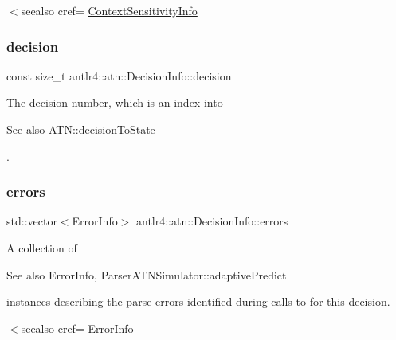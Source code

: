 $<$seealso cref= \hyperlink{classantlr4_1_1atn_1_1ContextSensitivityInfo}{Context\+Sensitivity\+Info} \mbox{\label{classantlr4_1_1atn_1_1DecisionInfo_ad81f14a210fb5e80f86ac800d56cc7bb}} 
\subsubsection{\texorpdfstring{decision}{decision}}
{\footnotesize\ttfamily const size\+\_\+t antlr4\+::atn\+::\+Decision\+Info\+::decision}



The decision number, which is an index into \begin{DoxySeeAlso}{See also}
A\+T\+N\+::decision\+To\+State


\end{DoxySeeAlso}
. 

\mbox{\label{classantlr4_1_1atn_1_1DecisionInfo_a38e19d544a49e811de5e3aaa762bc1c2}} 
\subsubsection{\texorpdfstring{errors}{errors}}
{\footnotesize\ttfamily std\+::vector$<$Error\+Info$>$ antlr4\+::atn\+::\+Decision\+Info\+::errors}



A collection of \begin{DoxySeeAlso}{See also}
Error\+Info, Parser\+A\+T\+N\+Simulator\+::adaptive\+Predict


\end{DoxySeeAlso}
instances describing the parse errors identified during calls to  for this decision. 

$<$seealso cref= Error\+Info \mbox{\label{classantlr4_1_1atn_1_1DecisionInfo_a51da41280fc7b9d27679b2c34bf8c76b}} 

